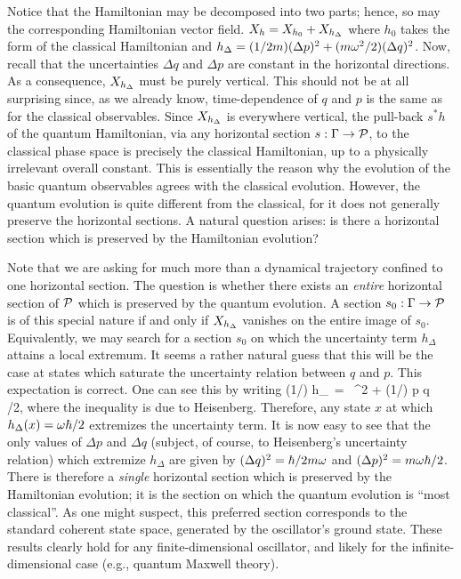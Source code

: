Notice that the Hamiltonian may be decomposed into two parts; hence,
so may the corresponding Hamiltonian vector field.  $\hvf{h} =
\hvf{h_0} + \hvf{h_\Delta}$ where $h_0$ takes the form of the
classical Hamiltonian and $h_\Delta = (1/2m)(\Delta p)^2 +
(m\w^2/2)(\Delta q)^2$.  Now, recall that the uncertainties $\Delta q$
and $\Delta p$ are constant in the horizontal directions.  As a
consequence, $\hvf{h_\Delta}$ must be purely vertical.  This should
not be at all surprising since, as we already know, time-dependence of
$q$ and $p$ is the same as for the classical observables.  Since
$\hvf{h_\Delta}$ is everywhere vertical, the pull-back $s^* h$ of the
quantum Hamiltonian, via any horizontal section $s : \Gamma
\rightarrow \P$, to the classical phase space is precisely the
classical Hamiltonian, up to a physically irrelevant overall constant.
This is essentially the reason why the evolution of the basic quantum
observables agrees with the classical evolution.  However, the quantum
evolution is quite different from the classical, for it does not
generally preserve the horizontal sections.  A natural question
arises: is there a horizontal section which is preserved by the
Hamiltonian evolution?  

Note that we are asking for much more than a dynamical trajectory
confined to one horizontal section. The question is whether there
exists an {\it entire} horizontal section of $\P$ which is preserved
by the quantum evolution.  A section $s_0 : \Gamma \rightarrow \P$ is
of this special nature if and only if $\hvf{h_\Delta}$ vanishes on the
entire image of $s_0$.  Equivalently, we may search for a section
$s_0$ on which the uncertainty term $h_\Delta$ attains a local
extremum.  It seems a rather natural guess that this will be the case
at states which saturate the uncertainty relation between $q$ and $p$.
This expectation is correct.  One can see this by writing
%
\be 
(1/\w\hbar) h_\Delta \, = \, ^2 + (1/\hbar) \Delta p \Delta q
\,\, /2, 
\ee 
%
where the inequality is due to Heisenberg.  Therefore, any state $x$
at which $h_\Delta(x) = \w\hbar/2$ extremizes the uncertainty term.
It is now easy to see that the only values of $\Delta p$ and $\Delta
q$ (subject, of course, to Heisenberg's uncertainty relation) which
extremize $h_\Delta$ are given by $(\Delta q)^2 = \hbar/2m\w$ and
$(\Delta p)^2 = m\w\hbar/2$.  There is therefore a {\it single}
horizontal section which is preserved by the Hamiltonian evolution; it
is the section on which the quantum evolution is ``most classical''.
As one might suspect, this preferred section corresponds to the
standard coherent state space, generated by the oscillator's ground
state.  These results clearly hold for any finite-dimensional
oscillator, and likely for the infinite-dimensional case (e.g.,
quantum Maxwell theory).

